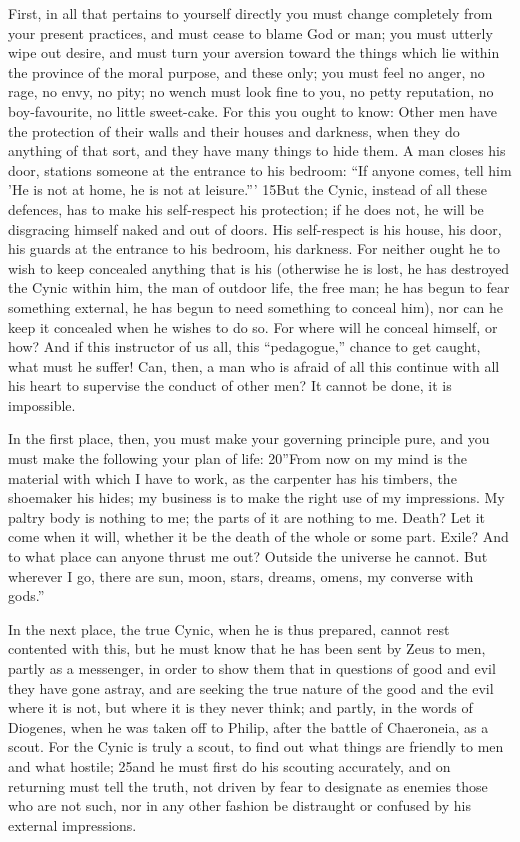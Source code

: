 First, in all that pertains to yourself directly you must change completely from your present practices, and must cease to blame God or man; you must utterly wipe out desire, and must turn your aversion toward the things which lie within the province of the moral purpose, and these only; you must feel no anger, no rage, no envy, no pity; no wench must look fine to you, no petty reputation, no boy-favourite, no little sweet-cake. For this you ought to know: Other men have the protection of their walls and their houses and darkness, when they do anything of that sort, and they have many things to hide them. A man closes his door, stations someone at the entrance to his bedroom: ``If anyone comes, tell him 'He is not at home, he is not at leisure.''' 15But the Cynic, instead of all these defences, has to make his self-respect his protection; if he does not, he will be disgracing himself naked and out of doors. His self-respect is his house, his door, his guards at the entrance to his bedroom, his darkness. For neither ought he to wish to keep concealed anything that is his (otherwise he is lost, he has destroyed the Cynic within him, the man of outdoor life, the free man; he has begun to fear something external, he has begun to need something to conceal him), nor can he keep it concealed when he wishes to do so. For where will he conceal himself, or how? And if this instructor of us all, this ``pedagogue,'' chance to get caught, what must he suffer! Can, then, a man who is afraid of all this continue with all his heart to supervise the conduct of other men? It cannot be done, it is impossible.

In the first place, then, you must make your governing principle pure, and you must make the following your plan of life: 20''From now on my mind is the material with which I have to work, as the carpenter has his timbers, the shoemaker his hides; my business is to make the right use of my impressions. My paltry body is nothing to me; the parts of it are nothing to me. Death? Let it come when it will, whether it be the death of the whole or some part. Exile? And to what place can anyone thrust me out? Outside the universe he cannot. But wherever I go, there are sun, moon, stars, dreams, omens, my converse with gods.''

In the next place, the true Cynic, when he is thus prepared, cannot rest contented with this, but he must know that he has been sent by Zeus to men, partly as a messenger, in order to show them that in questions of good and evil they have gone astray, and are seeking the true nature of the good and the evil where it is not, but where it is they never think; and partly, in the words of Diogenes, when he was taken off to Philip, after the battle of Chaeroneia, as a scout. For the Cynic is truly a scout, to find out what things are friendly to men and what hostile; 25and he must first do his scouting accurately, and on returning must tell the truth, not driven by fear to designate as enemies those who are not such, nor in any other fashion be distraught or confused by his external impressions.


